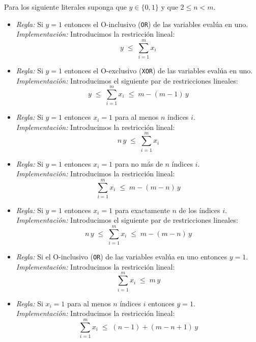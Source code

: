 \documentclass[ 10pt, xcolor = dvipsnames]{beamer}
\begin{document}
\begin{frame}[allowframebreaks]
\frametitle{\insertsection}

Para los siguiente literales suponga que $y \in \{ 0, 1 \}$ y que $2 \leq n < m$. 
\begin{itemize}
\item \emph{Regla:} Si $y = 1$ entonces el O-inclusivo (\texttt{OR}) de las variables eval\'ua en uno. \\[1ex] \emph{Implementaci\'on:} Introducimos la restricci\'on lineal: 
\[
y \; \leq \; \sum_{i=1}^m x_i
\]
\item \emph{Regla:} Si $y = 1$ entonces el O-exclusivo (\texttt{XOR}) de las variables eval\'ua en uno. \\[1ex] \emph{Implementaci\'on:} Introducimos el siguiente par de restricciones lineales: 
\[
y \; \leq \; \sum_{i=1}^m x_i \; \leq \; m - (m-1) \, y
\]
\framebreak

\item \emph{Regla:} Si $y = 1$ entonces $x_i = 1$ para al menos $n$ \'indices $i$. \\[1ex] \emph{Implementaci\'on:} Introducimos la restricci\'on lineal: 
\[
n \, y \; \leq \; \sum_{i=1}^m x_i
\]
\item \emph{Regla:} Si $y = 1$ entonces $x_i = 1$ para no m\'as de $n$ \'indices $i$. \\[1ex] \emph{Implementaci\'on:} Introducimos la restricci\'on lineal: 
\[
\sum_{i=1}^m x_i \; \leq \; m - (m-n) \, y
\]
\framebreak

\item \emph{Regla:} Si $y = 1$ entonces $x_i = 1$ para exactamente $n$ de los \'indices $i$. \\[1ex] \emph{Implementaci\'on:} Introducimos el siguiente par de restricciones lineales: 
\[
n \, y \; \leq \; \sum_{i=1}^m x_i \; \leq \; m - (m-n) \, y
\]
\framebreak

\item \emph{Regla:} Si el O-inclusivo (\texttt{OR}) de las variables eval\'ua en uno entonces $y=1$. \\[1ex] \emph{Implementaci\'on:} Introducimos la restricci\'on lineal: 
\[
\sum_{i=1}^m x_i \; \leq \; m \, y
\]
\item \emph{Regla:} Si $x_i = 1$ para al menos $n$ \'indices $i$ entonces $y=1$. \\[1ex] \emph{Implementaci\'on:} Introducimos la restricci\'on lineal: 
\[
\sum_{i=1}^m x_i \; \leq \; (n-1) + (m-n+1) \, y
\]
\framebreak


\end{itemize}
\end{frame}
\end{document}

